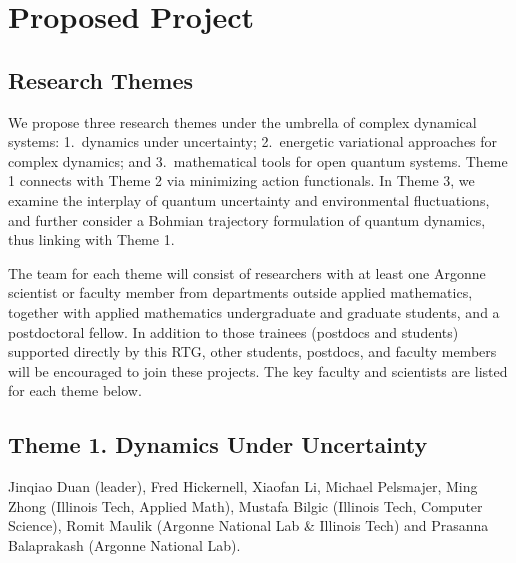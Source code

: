 \documentclass[11pt]{NSFamsart}
\newcommand{\FredNote}[1]{{\color{blue} Fred: #1}}
\begin{document}
\section{Proposed Project } \label{sec:researchproblems}
 

\subsection{Research Themes}

We propose three research themes under the umbrella of complex dynamical systems: 1.\ dynamics under uncertainty; 2.\  energetic variational approaches for complex dynamics; and 3.\ mathematical tools for open quantum systems. Theme 1 connects with Theme 2 via minimizing action functionals. In Theme 3, we examine the interplay of quantum uncertainty and environmental fluctuations, and further consider a Bohmian trajectory formulation of quantum dynamics, thus linking with Theme 1. 

The team for each theme will consist of researchers with at least one Argonne scientist or faculty member from departments outside applied mathematics, together with applied mathematics undergraduate and graduate students, and a postdoctoral
fellow. In addition to those trainees (postdocs and students) supported directly by this RTG, other students, postdocs, and faculty members will be encouraged to join these projects.  The key faculty and scientists are listed for each theme below.

\iffalse  
 While there   may be thematic driven differences on the approach to deliver knowledge and do research, each group share a similar year-round schedule that will allow awareness
and exchange of ideas throughout the academic year, mainly at the RTG graduate seminar.   Finally each summer program is centered on
an intense 2-week period. \FredNote{What does this mean?} Participating undergraduates will have a unique opportunity to work in a serious way on two topics, which we believe to be highly beneficial.
\fi
 

\subsection*{Theme 1. Dynamics  Under Uncertainty } 
Jinqiao Duan (leader), Fred Hickernell, Xiaofan Li,  Michael Pelsmajer, Ming Zhong (Illinois Tech, Applied Math), Mustafa Bilgic (Illinois Tech, Computer Science),  Romit Maulik (Argonne National Lab \& Illinois Tech) and Prasanna Balaprakash (Argonne National Lab). 
\end{document}
